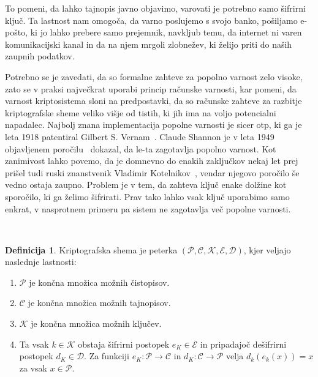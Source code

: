 \documentclass[12pt,a4paper,openany,tikz]{book}
\theoremstyle{plain}
\theoremstyle{definition}
\newtheorem{defn}[thm]{Definicija} %
\begin{document}
To pomeni, da lahko tajnopis javno objavimo, varovati je potrebno samo šifrirni ključ. Ta lastnost nam omogoča, da varno poslujemo s svojo banko, pošiljamo e-pošto, ki jo lahko prebere samo prejemnik, navkljub temu, da internet ni varen komunikacijski kanal in da na njem mrgoli zlobnežev, ki želijo priti do naših zaupnih podatkov.

Potrebno se je zavedati, da so formalne zahteve za popolno varnost zelo visoke, zato se v praksi največkrat uporabi princip računske varnosti, kar pomeni, da varnost kriptosistema sloni na predpostavki, da so računske zahteve za razbitje kriptografske sheme veliko višje od tistih, ki jih ima na voljo potencialni napadalec. Najbolj znana implementacija popolne varnosti je sicer \gls{otp}, ki ga je leta 1918 patentiral Gilbert S. Vernam~\cite{vernam1919secret}. Claude Shannon je v leta 1949 objavljenem poročilu~\cite{shannon1949communication} dokazal, da le-ta zagotavlja popolno varnost. Kot zanimivost lahko povemo, da je domnevno do enakih zaključkov nekaj let prej prišel tudi ruski znanstvenik Vladimir Kotelnikov~\cite{molotkov2006quantum}, vendar njegovo poročilo še vedno ostaja zaupno. Problem  je v tem, da zahteva ključ enake dolžine kot sporočilo, ki ga želimo šifrirati. Prav tako lahko vsak ključ uporabimo samo enkrat, v nasprotnem primeru pa sistem ne zagotavlja več popolne varnosti.

\

\begin{mdframed}[frametitle={Kriptografska shema}]
\begin{minipage}{\textwidth}
\begin{defn}
\label{def:cryptosystem}
Kriptografska shema je peterka  $(\mathcal{P}, \mathcal{C}, \mathcal{K},  \mathcal{E}, \mathcal{D})$, kjer veljajo naslednje lastnosti:
	\begin{enumerate}
		\item $\mathcal{P}$ je končna množica možnih čistopisov.
		\item $\mathcal{C}$ je končna množica možnih tajnopisov.
		\item $\mathcal{K}$ je končna množica možnih ključev.
		\item Ta vsak $k \in \mathcal{K}$ obstaja šifrirni postopek $e_K \in \mathcal{E}$ in pripadajoč dešifrirni postopek $d_K \in \mathcal{D}$. Za funkciji $e_K: \mathcal{P} \rightarrow \mathcal{C}$ in $d_K: \mathcal{C} \rightarrow \mathcal{P}$ velja $d_k(e_k(x)) = x$ za vsak $x \in \mathcal{P}$.
	\end{enumerate}
\end{defn}
\end{minipage}
\end{mdframed}
\end{document}
